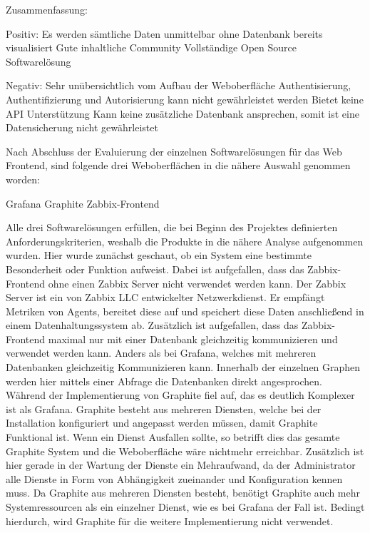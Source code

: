 Zusammenfassung:

\begin{outline}
  Positiv:
  \1 Es werden sämtliche Daten unmittelbar ohne Datenbank bereits visualisiert
  \1 Gute inhaltliche Community
  \1 Vollständige Open Source Softwarelösung

  Negativ:
  \1 Sehr unübersichtlich vom Aufbau der Weboberfläche
  \1 Authentisierung, Authentifizierung und Autorisierung kann nicht
  gewährleistet werden
  \1 Bietet keine API Unterstützung
  \1 Kann keine zusätzliche Datenbank ansprechen, somit ist eine Datensicherung
  nicht gewährleistet
\end{outline}

Nach Abschluss der Evaluierung der einzelnen Softwarelösungen für das Web
Frontend, sind folgende drei Weboberflächen in die nähere Auswahl genommen
worden:

\begin{outline}
  \1 Grafana
  \1 Graphite
  \1 Zabbix-Frontend
\end{outline}

Alle drei Softwarelösungen erfüllen, die bei Beginn des Projektes definierten
Anforderungskriterien, weshalb die Produkte in die nähere Analyse aufgenommen
wurden. Hier wurde zunächst geschaut, ob ein System eine bestimmte Besonderheit
oder Funktion aufweist. Dabei ist aufgefallen, dass das Zabbix-Frontend ohne
einen Zabbix Server nicht verwendet werden kann. Der Zabbix Server ist ein von
Zabbix LLC entwickelter Netzwerkdienst. Er empfängt Metriken von Agents,
bereitet diese auf und speichert diese Daten anschließend in einem
Datenhaltungssystem ab. Zusätzlich ist aufgefallen, dass das Zabbix-Frontend
maximal nur mit einer Datenbank gleichzeitig kommunizieren und verwendet werden
kann. Anders als bei Grafana, welches mit mehreren Datenbanken gleichzeitig
Kommunizieren kann. Innerhalb der einzelnen Graphen werden hier mittels einer
Abfrage die Datenbanken direkt angesprochen. Während der Implementierung von
Graphite fiel auf, das es deutlich Komplexer ist als Grafana. Graphite besteht
aus mehreren Diensten, welche bei der Installation konfiguriert und
angepasst werden müssen, damit Graphite Funktional ist. Wenn ein Dienst
Ausfallen sollte, so betrifft dies das gesamte Graphite System und die
Weboberfläche wäre nichtmehr erreichbar. Zusätzlich ist hier gerade in der
Wartung der Dienste ein Mehraufwand, da der Administrator alle Dienste in Form
von Abhängigkeit zueinander und Konfiguration kennen muss. Da Graphite aus
mehreren Diensten besteht, benötigt Graphite auch mehr Systemressourcen als ein
einzelner Dienst, wie es bei Grafana der Fall ist. Bedingt hierdurch, wird
Graphite für die weitere Implementierung nicht verwendet.
\mr%

